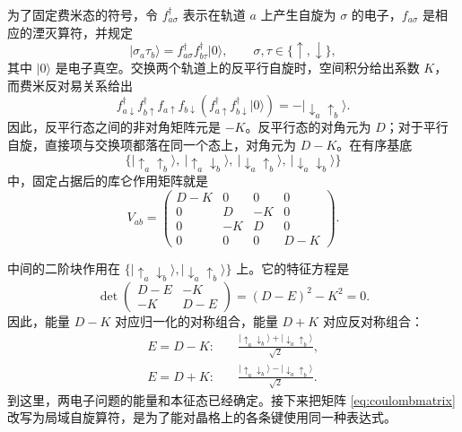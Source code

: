 \documentclass[UTF8,11pt,a4paper,fontset=fandol]{ctexart}
\newcommand{\ket}[1]{\lvert #1\rangle}
\begin{document}
为了固定费米态的符号，令 $f^\dagger_{a\sigma}$ 表示在轨道 $a$ 上产生自旋为 $\sigma$ 的电子，$f_{a\sigma}$ 是相应的湮灭算符，并规定
\begin{equation}
\ket{\sigma_a\tau_b}
=f^\dagger_{a\sigma}f^\dagger_{b\tau}\ket{0},
\qquad \sigma,\tau\in\{\uparrow,\downarrow\},
\end{equation}
其中 $\ket{0}$ 是电子真空。交换两个轨道上的反平行自旋时，空间积分给出系数 $K$，而费米反对易关系给出
\begin{equation}
f^\dagger_{a\downarrow}f^\dagger_{b\uparrow}
f_{a\uparrow}f_{b\downarrow}
\left(f^\dagger_{a\uparrow}f^\dagger_{b\downarrow}\ket{0}\right)
=-\ket{\downarrow_a\uparrow_b}.
\end{equation}
因此，反平行态之间的非对角矩阵元是 $-K$。反平行态的对角元为 $D$；对于平行自旋，直接项与交换项都落在同一个态上，对角元为 $D-K$。在有序基底
\begin{equation}
\bigl\{
\ket{\uparrow_a\uparrow_b},\
\ket{\uparrow_a\downarrow_b},\
\ket{\downarrow_a\uparrow_b},\
\ket{\downarrow_a\downarrow_b}
\bigr\}
\label{eq:pairbasis}
\end{equation}
中，固定占据后的库仑作用矩阵就是
\begin{equation}
V_{ab}=
\begin{pmatrix}
D-K&0&0&0\\
0&D&-K&0\\
0&-K&D&0\\
0&0&0&D-K
\end{pmatrix}.
\label{eq:coulombmatrix}
\end{equation}

中间的二阶块作用在 $\{\ket{\uparrow_a\downarrow_b},\ket{\downarrow_a\uparrow_b}\}$ 上。它的特征方程是
\begin{equation}
\det\begin{pmatrix}D-E&-K\\-K&D-E\end{pmatrix}
=(D-E)^2-K^2=0.
\end{equation}
因此，能量 $D-K$ 对应归一化的对称组合，能量 $D+K$ 对应反对称组合：
\begin{equation}
\begin{aligned}
E=D-K:\quad&
\frac{\ket{\uparrow_a\downarrow_b}+\ket{\downarrow_a\uparrow_b}}{\sqrt2},\\
E=D+K:\quad&
\frac{\ket{\uparrow_a\downarrow_b}-\ket{\downarrow_a\uparrow_b}}{\sqrt2}.
\end{aligned}
\label{eq:paireigen}
\end{equation}
到这里，两电子问题的能量和本征态已经确定。接下来把矩阵 \eqref{eq:coulombmatrix} 改写为局域自旋算符，是为了能对晶格上的各条键使用同一种表达式。
\end{document}
